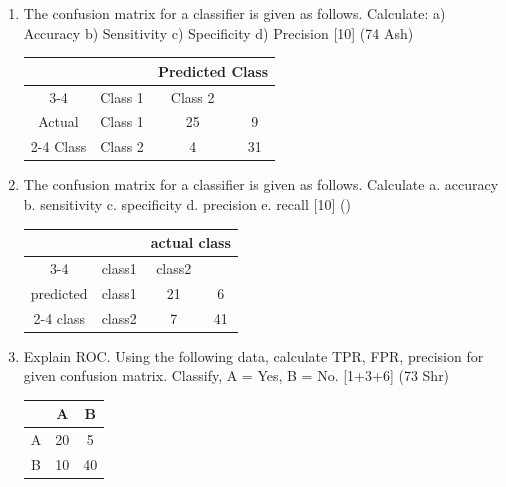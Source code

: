 \documentclass[12pt]{article}
\begin{document}
\begin{enumerate}[topsep=0pt, noitemsep]
      \item The confusion matrix for a classifier is given as follows. Calculate: a) Accuracy \quad b) Sensitivity \quad c) Specificity \quad d) Precision \hfill [10] (74 Ash)\\
        \small
        \begin{tabular}{|c|c|c|c|}
          \hline
          \multicolumn{2}{|c|}{} & \multicolumn{2}{c|}{Predicted Class} \\ \cline{3-4}
          \multicolumn{2}{|c|}{} & Class 1 & Class 2 \\ \hline
          Actual & Class 1 & 25 & 9 \\ \cline{2-4}
          Class & Class 2 & 4 & 31 \\ \hline
        \end{tabular}
        \normalsize

      \item The confusion matrix for a classifier is given as follows. Calculate a. accuracy \quad b. sensitivity \quad c. specificity \quad d. precision \quad e. recall \hfill [10] ()\\
        \small
        \begin{tabular}{|c|c|c|c|}
          \hline
          \multicolumn{2}{|c|}{} & \multicolumn{2}{c|}{actual class} \\ \cline{3-4}
          \multicolumn{2}{|c|}{} & class1 & class2 \\ \hline
          predicted & class1 & 21 & 6 \\ \cline{2-4}
          class & class2 & 7 & 41 \\ \hline
        \end{tabular}
        \normalsize

      \item Explain ROC. Using the following data, calculate TPR, FPR, precision for given confusion matrix. Classify, A = Yes, B = No. \hfill [1+3+6] (73 Shr)\\
        \small
        \begin{tabular}{|c|c|c|}
          \hline
           & A & B \\ \hline
          A & 20 & 5 \\ \hline
          B & 10 & 40 \\ \hline
        \end{tabular}
        \normalsize


\end{enumerate}
\end{document}
